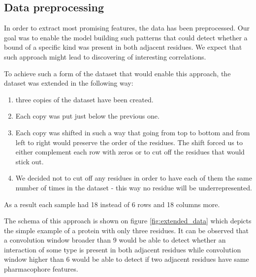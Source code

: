 \documentclass[a4paper,10pt]{report}
\begin{document}


	\subsection{Data preprocessing}\label{sec:data_processing}
	  In order to extract most promising features, the data has been preprocessed. Our goal was to enable the model building such patterns that could detect whether a bound of a specific kind was present in both adjacent residues. We expect that such approach might lead to discovering of interesting correlations. 
	  
	  To achieve such a form of the dataset that would enable this approach, the dataset was extended in the following way:
	  \begin{enumerate}
	   \item three copies of the dataset have been created.
	   \item Each copy was put just below the previous one. 
	   \item Each copy was shifted in such a way that going from top to bottom and from left to right would preserve the order of the residues. The shift forced us to either complement each row with zeros or to cut off the residues that would stick out.
	   \item We decided not to cut off any residues in order to have each of them the same number of times in the dataset - this way no residue will be underrepresented.
	  \end{enumerate}

	  As a result each sample had 18 instead of 6 rows and 18 columns more. 
	  
	  The schema of this approach is shown on figure \ref{fig:extended_data} which depicts the simple example of a protein with only three residues. It can be observed that a convolution window broader than 9 would be able to detect whether an interaction of some type is present in both adjacent residues while convolution window higher than 6 would be able to detect if two adjacent residues have same pharmacophore features. 
	  
\end{document}
